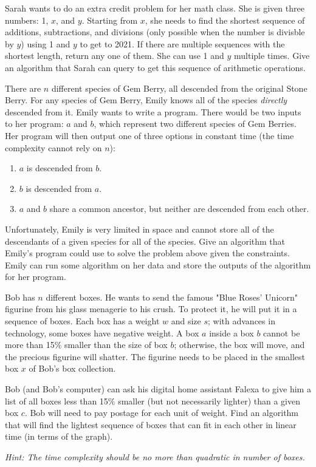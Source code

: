 \documentclass{article}
\begin{document}
\begin{subparts}
    \subpart Sarah wants to do an extra credit problem for her math class. She is given three numbers: 1, $x$, and $y$. Starting from $x$, she needs to find the shortest sequence of additions, subtractions, and divisions (only possible when the number is divisble by $y$) using 1 and $y$ to get to 2021. If there are multiple sequences with the shortest length, return any one of them. She can use 1 and $y$ multiple times. Give an algorithm that Sarah can query to get this sequence of arithmetic operations.
    
    \subpart There are $n$ different species of Gem Berry, all descended from the original Stone Berry. For any species of Gem Berry, Emily knows all of the species \textit{directly} descended from it. Emily wants to write a program. There would be two inputs to her program: $a$ and $b$, which represent two different species of Gem Berries. Her program will then output one of three options in constant time (the time complexity cannot rely on $n$): 
    \begin{enumerate}[(1)]
        \item $a$ is descended from $b$.
        \item $b$ is descended from $a$.
        \item $a$ and $b$ share a common ancestor, but neither are descended from each other.
    \end{enumerate}
    Unfortunately, Emily is very limited in space and cannot store all of the descendants of a given species for all of the species. Give an algorithm that Emily's program could use to solve the problem above given the constraints. Emily can run some algorithm on her data and store the outputs of the algorithm for her program.  
    
    \subpart Bob has $n$ different boxes. He wants to send the famous "Blue Roses' Unicorn" figurine from his glass menagerie to his crush. To protect it, he will put it in a sequence of boxes. Each box has a weight $w$ and size $s$; with advances in technology, some boxes have negative weight. A box $a$ inside a box $b$ cannot be more than 15\% smaller than the size of box $b$; otherwise, the box will move, and the precious figurine will shatter. The figurine needs to be placed in the smallest box $x$ of Bob's box collection. 
    
\noindent Bob (and Bob's computer) can ask his digital home assistant Falexa to give him a list of all boxes less than 15\% smaller (but not necessarily lighter) than a given box $c$. Bob will need to pay postage for each unit of weight. Find an algorithm that will find the lightest sequence of boxes that can fit in each other in linear time (in terms of the graph). 

\noindent \textit{Hint: The time complexity should be no more than quadratic in number of boxes.}

\end{subparts}
\end{document}
